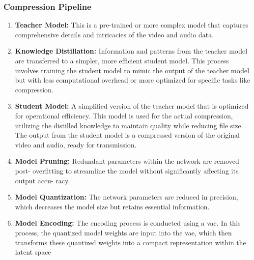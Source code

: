 \documentclass{ioereport}
\begin{document}
        \subsubsection{Compression Pipeline}
        \begin{enumerate}[label=\textbf{\roman*.}]
          \item \textbf{Teacher Model:} This is a pre-trained or more complex model that captures comprehensive details and intricacies of the video and audio data.
          \item \textbf{Knowledge Distillation:} Information and patterns from the teacher model are transferred to a simpler, more efficient student model. This process involves training the student model to mimic the output of the teacher model but with less computational overhead or more optimized for specific tasks like compression.
          \item \textbf{Student Model:} A simplified version of the teacher model that is optimized for operational efficiency. This model is used for the actual compression, utilizing the distilled knowledge to maintain quality while reducing file size. The output from the student model is a compressed version of the original video and audio, ready for transmission.
          
        \item \textbf{Model Pruning:} Redundant parameters within the network are removed post- overfitting to streamline the model without significantly affecting its output accu- racy.
        \item \textbf{Model Quantization:} The network parameters are reduced in precision, which decreases the model size but retains essential information.
        \item \textbf{Model Encoding:} The encoding process is conducted using a \gls{vae}. In this process, the quantized model weights are input into the \gls{vae}, which then transforms these quantized weights into a compact representation within the latent space
    
        \end{enumerate}
\end{document}
